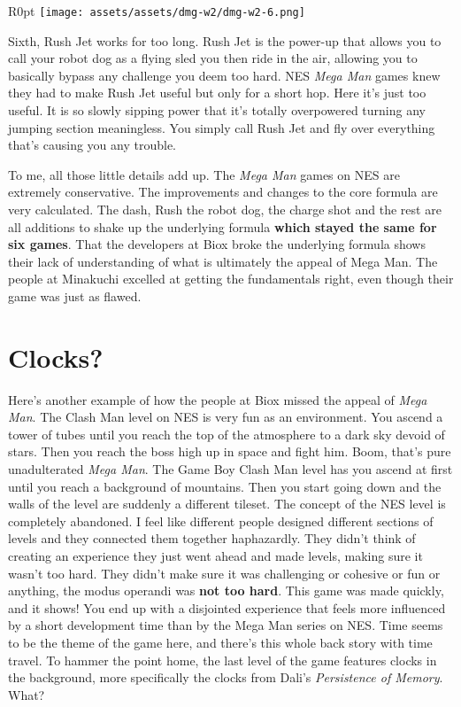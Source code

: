 \documentclass{book}
\begin{document}
\begin{wrapfigure}{R}{0pt} \texttt{[image: assets/assets/dmg-w2/dmg-w2-6.png]}\end{wrapfigure}
Sixth, Rush Jet works for too long. Rush Jet is the power-up that allows you to call your robot dog as a flying sled you then ride in the air, allowing you to basically bypass any challenge you deem too hard. NES \emph{Mega Man} games knew they had to make Rush Jet useful but only for a short hop. Here it’s just too useful. It is so slowly sipping power that it’s totally overpowered turning any jumping section meaningless. You simply call Rush Jet and fly over everything that’s causing you any trouble.

To me, all those little details add up. The \emph{Mega Man} games on NES are extremely conservative. The improvements and changes to the core formula are very calculated. The dash, Rush the robot dog, the charge shot and the rest are all additions to shake up the underlying formula \textbf{which stayed the same for six games}. That the developers at Biox broke the underlying formula shows their lack of understanding of what is ultimately the appeal of Mega Man. The people at Minakuchi excelled at getting the fundamentals right, even though their game was just as flawed.

\FloatBarrier\needspace{10mm}\section*{Clocks?}\nopagebreak[4]

Here’s another example of how the people at Biox missed the appeal of \emph{Mega Man}. The Clash Man level on NES is very fun as an environment. You ascend a tower of tubes until you reach the top of the atmosphere to a dark sky devoid of stars. Then you reach the boss high up in space and fight him. Boom, that’s pure unadulterated \emph{Mega Man}. The Game Boy Clash Man level has you ascend at first until you reach a background of mountains. Then you start going down and the walls of the level are suddenly a different tileset. The concept of the NES level is completely abandoned. I feel like different people designed different sections of levels and they connected them together haphazardly. They didn’t think of creating an experience they just went ahead and made levels, making sure it wasn’t too hard. They didn’t make sure it was challenging or cohesive or fun or anything, the modus operandi was \textbf{not too hard}. This game was made quickly, and it shows! You end up with a disjointed experience that feels more influenced by a short development time than by the Mega Man series on NES. Time seems to be the theme of the game here, and there’s this whole back story with time travel. To hammer the point home, the last level of the game features clocks in the background, more specifically the clocks from Dali’s \emph{Persistence of Memory}. What?
\end{document}

